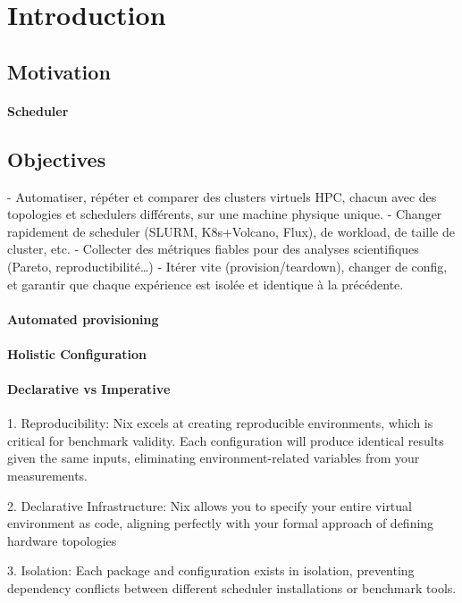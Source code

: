 \section{Introduction}

\subsection{Motivation}

\paragraph{Scheduler}

\subsection{Objectives}
\label{sec:objectives}

- Automatiser, répéter et comparer des clusters virtuels HPC, chacun avec des topologies et schedulers différents, sur une machine physique unique.
- Changer rapidement de scheduler (SLURM, K8s+Volcano, Flux), de workload, de taille de cluster, etc.
- Collecter des métriques fiables pour des analyses scientifiques (Pareto, reproductibilité…)
- Itérer vite (provision/teardown), changer de config, et garantir que chaque expérience est isolée et identique à la précédente.

\paragraph{Automated provisioning}
\paragraph{Holistic Configuration}
\paragraph{Declarative vs Imperative}

1. Reproducibility: Nix excels at creating reproducible environments, which is critical for benchmark validity. Each configuration will produce identical results given the same inputs, eliminating environment-related variables from your measurements.

2. Declarative Infrastructure: Nix allows you to specify your entire virtual environment as code, aligning perfectly with your formal approach of defining hardware topologies

3. Isolation: Each package and configuration exists in isolation, preventing dependency conflicts between different scheduler installations or benchmark tools.

